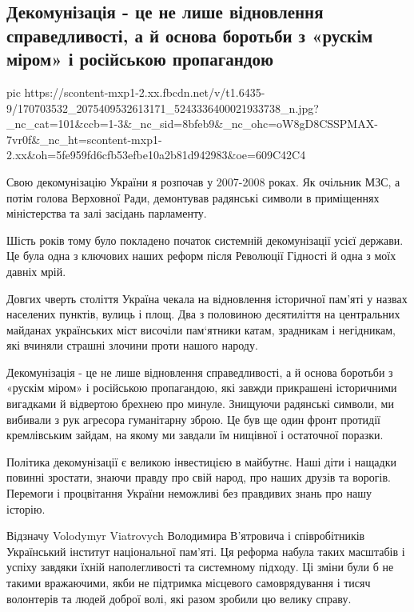  
 
 
 
 
\subsection{Декомунізація - це не лише відновлення справедливості, а й основа боротьби з «рускім міром» і російською пропагандою}
\label{sec:09_04_2021.fb.jacenjuk_arsenij.1.dekomunizacia}

\ifcmt
  pic https://scontent-mxp1-2.xx.fbcdn.net/v/t1.6435-9/170703532_2075409532613171_5243336400021933738_n.jpg?_nc_cat=101&ccb=1-3&_nc_sid=8bfeb9&_nc_ohc=oW8gD8CSSPMAX-7vr0f&_nc_ht=scontent-mxp1-2.xx&oh=5fe959fd6cfb53efbe10a2b81d942983&oe=609C42C4
\fi

Свою декомунізацію України я розпочав у 2007-2008 роках. Як очільник МЗС, а
потім голова Верховної Ради, демонтував радянські символи в приміщеннях
міністерства та залі засідань парламенту. 

Шість років тому було покладено початок системній декомунізації усієї держави.
Це була одна з ключових наших реформ після Революції Гідності й одна з моїх
давніх мрій. 

Довгих чверть століття Україна чекала на відновлення історичної пам’яті у
назвах населених пунктів, вулиць і площ. Два з половиною десятиліття на
центральних майданах українських міст височіли пам‘ятники катам, зрадникам і
негідникам, які вчиняли страшні злочини проти нашого народу. 

Декомунізація - це не лише відновлення справедливості, а й основа боротьби з
«рускім міром» і російською пропагандою, які завжди прикрашені історичними
вигадками й відвертою брехнею про минуле. Знищуючи радянські символи, ми
вибивали з рук агресора гуманітарну зброю. Це був ще один фронт протидії
кремлівським зайдам, на якому ми завдали їм нищівної і остаточної поразки. 

Політика декомунізації є великою інвестицією в майбутнє. Наші діти і нащадки
повинні зростати, знаючи правду про свій народ, про наших друзів та ворогів.
Перемоги і процвітання України неможливі без правдивих знань про нашу історію. 

Відзначу Volodymyr Viatrovych Володимира В’ятровича і співробітників
Український інститут національної пам'яті. Ця реформа набула таких масштабів і
успіху завдяки їхній наполегливості та системному підходу.  Ці зміни були б не
такими вражаючими, якби не підтримка місцевого самоврядування і тисяч
волонтерів та людей доброї волі, які разом зробили цю велику справу.
